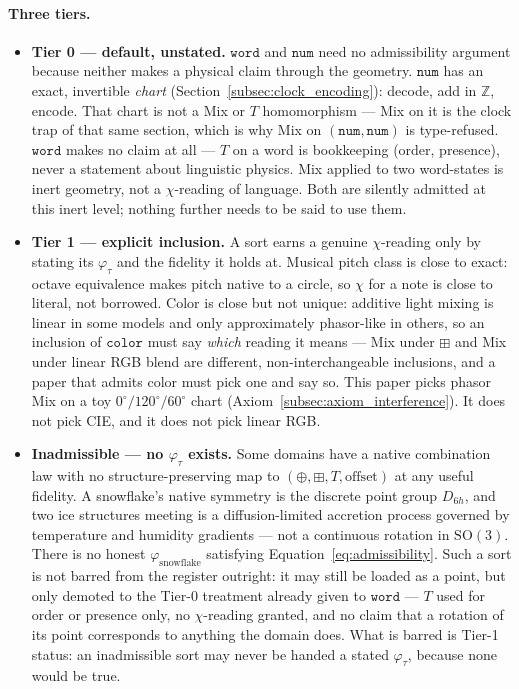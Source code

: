 \documentclass[12pt, a4paper]{article}
\begin{document}
\paragraph{Three tiers.}
\begin{itemize}
    \item \textbf{Tier 0 --- default, unstated.} $\mathtt{word}$ and
    $\mathtt{num}$ need no admissibility argument because neither
    makes a physical claim through the geometry. $\mathtt{num}$
    has an exact, invertible \emph{chart}
    (Section~\ref{subsec:clock_encoding}): decode, add in
    $\mathbb{Z}$, encode. That chart is not a Mix or $T$
    homomorphism --- Mix on it is the clock trap of that same
    section, which is why Mix on $(\mathtt{num},\mathtt{num})$ is
    type-refused. $\mathtt{word}$ makes no claim at all --- $T$ on a
    word is bookkeeping (order, presence), never a statement about
    linguistic physics. Mix applied to two word-states is inert
    geometry, not a $\chi$-reading of language. Both are silently
    admitted at this inert level; nothing further needs to be said
    to use them.

    \item \textbf{Tier 1 --- explicit inclusion.} A sort earns a
    genuine $\chi$-reading only by stating its $\varphi_\tau$ and the
    fidelity it holds at. Musical pitch class is close to exact:
    octave equivalence makes pitch native to a circle, so $\chi$ for
    a note is close to literal, not borrowed. Color is close but not
    unique: additive light mixing is linear in some models and only
    approximately phasor-like in others, so an inclusion of
    $\mathtt{color}$ must say \emph{which} reading it means --- Mix
    under $\boxplus$ and Mix under linear RGB blend are different,
    non-interchangeable inclusions, and a paper that admits color
    must pick one and say so. This paper picks phasor Mix on a toy
    $0^\circ/120^\circ/60^\circ$ chart
    (Axiom~\ref{subsec:axiom_interference}). It does not pick CIE,
    and it does not pick linear RGB.

    \item \textbf{Inadmissible --- no $\varphi_\tau$ exists.} Some
    domains have a native combination law with no structure-preserving
    map to $(\oplus,\boxplus,T,\text{offset})$ at any useful fidelity.
    A snowflake's native symmetry is the discrete point group
    $D_{6h}$, and two ice structures meeting is a diffusion-limited
    accretion process governed by temperature and humidity gradients
    --- not a continuous rotation in $\mathrm{SO}(3)$. There is no
    honest $\varphi_{\mathrm{snowflake}}$ satisfying
    Equation~\eqref{eq:admissibility}. Such a sort is not barred from
    the register outright: it may still be loaded as a point, but
    only demoted to the Tier-0 treatment already given to
    $\mathtt{word}$ --- $T$ used for order or presence only, no
    $\chi$-reading granted, and no claim that a rotation of its point
    corresponds to anything the domain does. What is barred is Tier-1
    status: an inadmissible sort may never be handed a stated
    $\varphi_\tau$, because none would be true.
\end{itemize}
\end{document}
